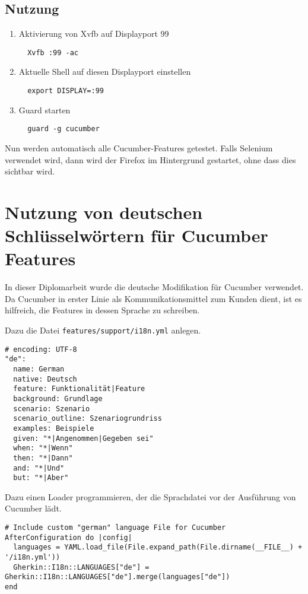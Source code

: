 \subsection*{Nutzung}

\begin{enumerate}
 \item Aktivierung von Xvfb auf Displayport 99
 \begin{verbatim}
  Xvfb :99 -ac
 \end{verbatim}
 
 \item Aktuelle Shell auf diesen Displayport einstellen
 \begin{verbatim}
  export DISPLAY=:99
 \end{verbatim}
 
 \item Guard starten
 \begin{verbatim}
  guard -g cucumber
 \end{verbatim}
\end{enumerate}

Nun werden automatisch alle Cucumber-Features getestet. Falls Selenium verwendet wird, dann wird der Firefox im Hintergrund gestartet, ohne dass dies sichtbar wird.

\section{Nutzung von deutschen Schlüsselwörtern für Cucumber Features}

In dieser Diplomarbeit wurde die deutsche Modifikation für Cucumber verwendet. Da Cucumber in erster Linie als Kommunikationsmittel zum Kunden dient, ist es hilfreich, die Features in dessen Sprache zu schreiben.

Dazu die Datei \texttt{features/support/i18n.yml} anlegen.

\begin{lstlisting}[name=cucumber-lang,caption=features/support/i18n.yml,label=cucumber-lang]
# encoding: UTF-8
"de":
  name: German
  native: Deutsch
  feature: Funktionalität|Feature
  background: Grundlage
  scenario: Szenario
  scenario_outline: Szenariogrundriss
  examples: Beispiele
  given: "*|Angenommen|Gegeben sei"
  when: "*|Wenn"
  then: "*|Dann"
  and: "*|Und"
  but: "*|Aber"
\end{lstlisting}

Dazu einen Loader programmieren, der die Sprachdatei vor der Ausführung von Cucumber lädt.

\begin{lstlisting}[caption=features/support/i18n\_loader.rb]
# Include custom "german" language File for Cucumber
AfterConfiguration do |config|
  languages = YAML.load_file(File.expand_path(File.dirname(__FILE__) + '/i18n.yml'))
  Gherkin::I18n::LANGUAGES["de"] = Gherkin::I18n::LANGUAGES["de"].merge(languages["de"])
end
\end{lstlisting}



\newpage
\listoffigures



\lstlistoflistings
